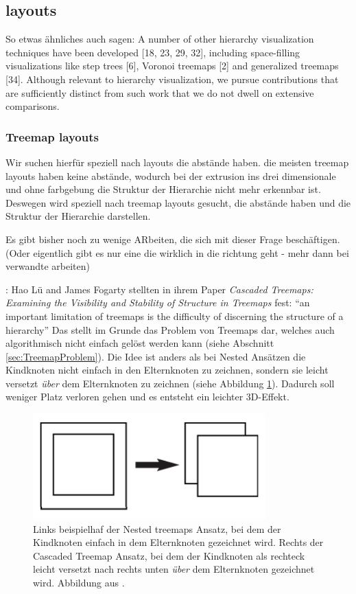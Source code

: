 \subsection{layouts}

So etwas ähnliches auch sagen:
A number of other hierarchy visualization techniques have been
developed [18, 23, 29, 32], including space-filling visualizations
like step trees [6], Voronoi treemaps [2] and generalized treemaps
[34]. Although relevant to hierarchy visualization, we pursue
contributions that are sufficiently distinct from such work that we
do not dwell on extensive comparisons. \cite{lu2008cascaded}

\subsubsection{Treemap layouts}
Wir suchen hierfür speziell nach layouts die abstände haben. die meisten treemap layouts haben keine abstände, wodurch bei der extrusion ins drei dimensionale und ohne farbgebung die Struktur der Hierarchie nicht mehr erkennbar ist. Deswegen wird speziell nach treemap layouts gesucht, die abstände haben und die Struktur der Hierarchie darstellen.


Es gibt bisher noch zu wenige ARbeiten, die sich mit dieser Frage beschäftigen. (Oder eigentlich gibt es nur eine die wirklich in die richtung geht - mehr dann bei verwandte arbeiten)


\cite{lu2008cascaded}:
Hao Lü and James Fogarty stellten in ihrem Paper \textit{Cascaded Treemaps:
Examining the Visibility and Stability of Structure in Treemaps}\cite{lu2008cascaded} fest: \enquote{an important limitation of treemaps is
the difficulty of discerning the structure of a hierarchy}\cite[1]{lu2008cascaded} Das stellt im Grunde das Problem von Treemaps dar, welches auch algorithmisch nicht einfach gelöst werden kann (siehe Abschnitt \ref{sec:TreemapProblem}). Die Idee ist anders als bei Nested Ansätzen die Kindknoten nicht einfach in den Elternknoten zu zeichnen, sondern sie leicht versetzt \textit{über} dem Elternknoten zu zeichnen (siehe Abbildung \ref{fig:cascaded}). Dadurch soll weniger Platz verloren gehen und es entsteht ein leichter 3D-Effekt.

\begin{figure}
    \centering
    \includegraphics[width=0.8\textwidth]{images/cascaded.png}
    \caption{Links beispielhaf der Nested treemaps Ansatz, bei dem der Kindknoten einfach in dem Elternknoten gezeichnet wird. Rechts der Cascaded Treemap Ansatz, bei dem der Kindknoten als rechteck leicht versetzt nach rechts unten \textit{über} dem Elternknoten gezeichnet wird. Abbildung aus \cite[3]{lu2008cascaded}.}
    \label{fig:cascaded}
\end{figure}


